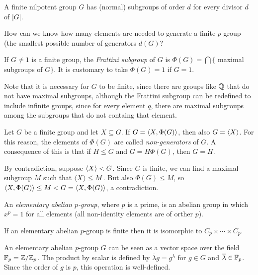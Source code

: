 \documentclass[twoside, 11pt]{article}
\begin{document}
\begin{coro}
A finite nilpotent group $G$ has (normal) subgroups of order $d$ for every divisor $d$ of $|G|$. 
\end{coro}

How can we know how many elements are needed to generate a finite $p$-group (the smallest possible number of generators $d(G)$?

\begin{defi}
If $G\neq 1$ is a finite group, the \emph{Frattini subgroup} of $G$ is $\Phi(G)=\bigcap\{$ maximal subgroups of $G\}$. It is customary to take $\Phi(G)=1$ if $G=1$. 
\end{defi}

Note that it is necessary for $G$ to be finite, since there are groups like $\mathbb{Q}$ that do not have maximal subgroups, although the Frattini subgroup can be redefined to include infinite groups, since for every element $q$, there are maximal subgroups among the subgroups that do not containg that element. 

\begin{teorema}
Let $G$ be a finite group and let $X\subseteq G$. If $G=\langle{X,\Phi(G)}\rangle$, then also $G=\langle{X}\rangle$. For this reason, the elements of $\Phi(G)$ are called \emph{non-generators} of $G$. A consequence of this is that if $H\leq G$ and $G=H\Phi(G)$, then $G=H$. 
\end{teorema}
\begin{dem}
By contradiction, suppose $\langle{X}\rangle<G$. Since $G$ is finite, we can find a maximal subgroup $M$ such that $\langle{X}\rangle\leq M$. But also $\Phi(G)\leq M$, so $\langle{X,\Phi(G)}\rangle\leq M<G=\langle{X,\Phi(G)}\rangle$, a contradiction.
\end{dem}

\begin{defi}
An \emph{elementary abelian $p$-group}, where $p$ is a prime, is an abelian group in which $x^p=1$ for all elements (all non-identity elements are of orther $p$).
\end{defi}

If an elementary abelian $p$-group is finite then it is isomorphic to $C_p\times\cdots\times C_p$. 

\begin{nota}
An elementary abelian $p$-group $G$ can be seen as a vector space over the field $\mathbb{F}_p=\mathbb{Z}/\mathbb{Z}_p$. The product by scalar is defined by $\overline{\lambda}g=g^{\lambda}$ for $g\in G$ and $\overline{\lambda}\in\mathbb{F}_p$. Since the order of $g$ is $p$, this operation is well-defined. 
\end{nota}
\end{document}
